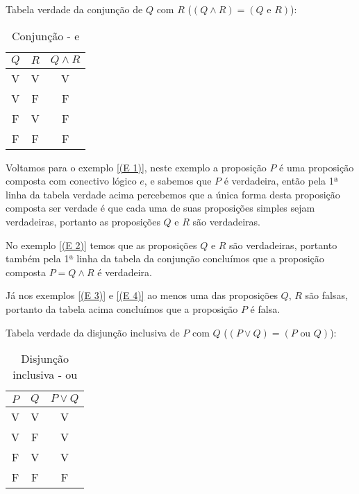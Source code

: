  Tabela verdade da conjunção de $Q$ com $R$ ($(Q \land R)= (Q \text{ e } R)$):

 \begin{table}[H]
 \centering
 \begin{tabular}{|c|c|c|} \hline
 \rowcolor{cinza}
 $Q$ & $R$ & $Q \land R$ \\ \hline
 V & V & V  \\ \hline
 V & F & F  \\ \hline
 F & V & F  \\ \hline
 F & F & F \\ \hline
 \end{tabular}
 \caption{Conjunção - e}
\end{table}

\begin{exem}
 Voltamos para o exemplo \ref{(E 1)}, neste exemplo a proposição $P$ é uma proposição composta com conectivo lógico $e$, e sabemos que $P$ é verdadeira, então pela 1ª linha da tabela verdade acima percebemos que a única forma desta proposição composta ser verdade é que cada uma de suas proposições simples sejam verdadeiras, portanto as proposições $Q$ e $R$ são verdadeiras.

 No exemplo \ref{(E 2)} temos que as proposições $Q$ e $R$ são verdadeiras, portanto também pela 1ª linha da tabela da conjunção concluímos que a proposição composta $P= Q \land R$ é verdadeira.

 Já nos exemplos \ref{(E 3)} e \ref{(E 4)} ao menos uma das proposições $Q$, $R$ são falsas, portanto da tabela acima concluímos que a proposição $P$ é falsa.
\end{exem}


 Tabela verdade da disjunção inclusiva de $P$ com $Q$ ($(P \lor Q)= (P \text{ ou } Q)$):
 \begin{table}[H]
 \centering
 \begin{tabular}{|c|c|c|} \hline
 \rowcolor{cinza}
 $P$ & $Q$ & $P \lor Q$ \\ \hline
 V & V & V \\ \hline
 V & F & V \\ \hline
 F & V & V \\ \hline
 F & F & F \\ \hline
 \end{tabular}
 \caption{Disjunção inclusiva - ou}
\end{table}

